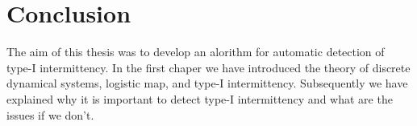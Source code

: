 \chapter{Conclusion}

The aim of this thesis was to develop an alorithm for automatic detection of type-I intermittency.
In the first chaper we have introduced the theory of discrete dynamical systems, logistic map, and type-I intermittency.
Subsequently we have explained why it is important to detect type-I intermittency and what are the issues if we don't.

\endinput